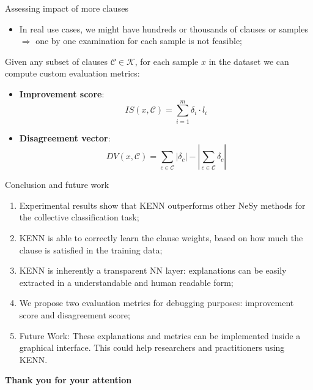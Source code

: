 \documentclass{beamer}
\newcommand{\backupbegin}{
	\newcounter{framenumberappendix}
	\setcounter{framenumberappendix}{\value{framenumber}}
}
\begin{document}
\begin{frame}{Assessing impact of more clauses}
	\begin{itemize}
		\item In real use cases, we might have hundreds or thousands of clauses or samples $\Rightarrow$ one by one examination for each sample is not feasible;
	\end{itemize}
	Given any subset of clauses $\mathcal{C} \in \mathcal{K}$, for each sample $x$ in the dataset we can compute custom evaluation metrics:
	\begin{itemize}
		\item \textbf{Improvement score}: $$I S(x, \mathcal{C})=\sum_{i=1}^{m} \delta_{i} \cdot l_{i}$$
		\item \textbf{Disagreement vector}: 
		$$D V(x, \mathcal{C})=\sum_{c \in \mathcal{C}}\left|\delta_{c}\right|-\left|\sum_{c \in \mathcal{C}} \delta_{c}\right|$$
	\end{itemize}
\end{frame}

\begin{frame}{Conclusion and future work}
	\begin{enumerate}
		\item Experimental results show that KENN outperforms other NeSy methods for the collective classification task;
		\item KENN is able to correctly learn the clause weights, based on how much the clause is satisfied in the training data;
		\item KENN is inherently a transparent NN layer: explanations can be easily extracted in a understandable and human readable form;
		\item We propose two evaluation metrics for debugging purposes: improvement score and disagreement score;
		\item Future Work: These explanations and metrics can be implemented inside a graphical interface. This could help researchers and practitioners using KENN.
	\end{enumerate}
\end{frame}


\begin{frame}{}
	\centering \Large
	\textcolor{unipd}{\textbf{Thank you for your attention}}
\end{frame}

\appendix
\backupbegin
\end{document}
